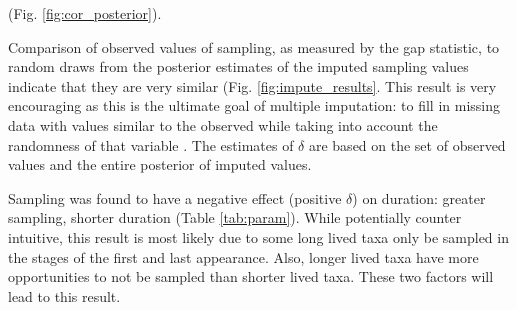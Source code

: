 \documentclass{article}
\begin{document}
(Fig. \ref{fig:cor_posterior}). 







Comparison of observed values of sampling, as measured by the gap statistic, to random draws from the posterior estimates of the imputed sampling values indicate that they are very similar (Fig. \ref{fig:impute_results}. This result is very encouraging as this is the ultimate goal of multiple imputation: to fill in missing data with values similar to the observed while taking into account the randomness of that variable \citep{Rubin1996,Gelman2007}. The estimates of \(\delta\) are based on the set of observed values and the entire posterior of imputed values.

Sampling was found to have a negative effect (positive \(\delta\)) on duration: greater sampling, shorter duration (Table \ref{tab:param}). While potentially counter intuitive, this result is most likely due to some long lived taxa only be sampled in the stages of the first and last appearance. Also, longer lived taxa have more opportunities to not be sampled than shorter lived taxa. These two factors will lead to this result. 
\end{document}
